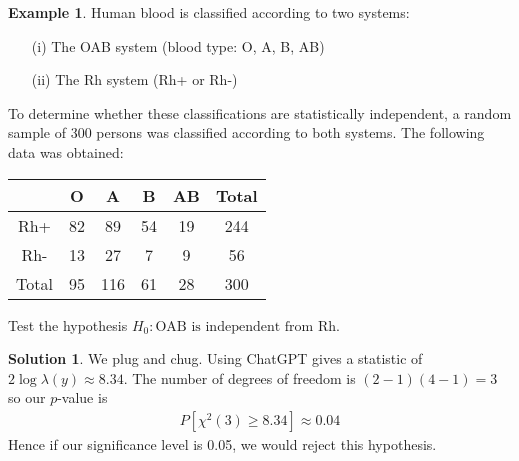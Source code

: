 \documentclass[11pt]{amsart}
\theoremstyle{definition}
\newtheorem{example}[theorem]{Example}
\newtheorem{solution}[theorem]{Solution}
\numberwithin{equation}{section}
\begin{document}
\begin{example}\label{blood}
    Human blood is classified according to two systems:
    \begin{enumerate}
        \item [(i)] The OAB system (blood type: O, A, B, AB)
        \item [(ii)] The Rh system (Rh+ or Rh-)
    \end{enumerate}
    To determine whether these classifications are statistically independent, a random sample of 300 persons was classified according to both systems. The following data was obtained:
    \begin{center}
        \begin{tabular}{c|c|c|c|c|c}
             & O & A & B & AB & Total \\
             \hline
            Rh+ & 82 & 89 & 54 & 19 & 244\\
            \hline
            Rh- & 13 & 27 & 7 & 9 & 56\\
            \hline
            Total & 95 & 116 & 61 & 28 & 300
        \end{tabular}
    \end{center}
    Test the hypothesis $H_0:\text{OAB is independent from Rh}$.
\end{example}
\addtocounter{theorem}{-1}
\begin{solution}
    We plug and chug. Using ChatGPT gives a statistic of $2\log\lambda(y)\approx 8.34$. The number of degrees of freedom is $(2-1)(4-1)=3$ so our $p$-value is
    \begin{align*}
        P[\chi^2(3)\ge 8.34]\approx 0.04
    \end{align*}
    Hence if our significance level is 0.05, we would reject this hypothesis.
\end{solution}
\end{document}

